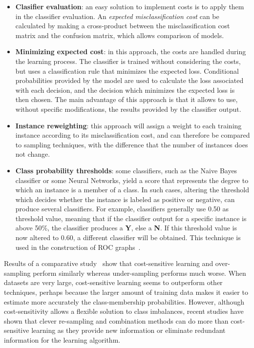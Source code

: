 \begin{itemize}
\item \textbf{Clasifier evaluation}: an easy solution to implement costs is to apply them in the classifier evaluation. An \textit{expected misclassification cost} can be calculated by making a cross-product between the misclassification cost matrix and the confusion matrix, which allows comparison of models.
\item \textbf{Minimizing expected cost}: in this approach, the costs are handled during the learning process. The classifier is trained without considering the costs, but uses a classification rule that minimizes the expected loss. Conditional probabilities provided by the model are used to calculate the loss associated with each decision, and the decision which minimizes the expected loss is then chosen. The main advantage of this approach is that it allows to use, without specific modifications, the results provided by the classifier output.
\item \textbf{Instance reweighting}: this approach will assign a weight to each training instance according to its misclassification cost, and can therefore be compared to sampling techniques, with the difference that the number of instances does not change.
\item \textbf{Class probability thresholds}: some classifiers, such as the Naive Bayes classifier or some Neural Networks, yield a score that represents the degree to which an instance is a member of a class.  In such cases, altering the threshold which decides whether the instance is labeled as positive or negative, can produce several classifiers. For example, classifiers generally use 0.50 as threshold value, meaning that if the classifier output for a specific instance is above 50\%, the classifier produces a \textbf{Y}, else a \textbf{N}.  If this threshold value is now altered to 0.60, a different classifier will be obtained.  This technique is used in the construction of ROC graphs~\cite{roc}.
\end{itemize}
Results of a comparative study~\cite{mccarthy} show that cost-sensitive learning and over-sampling perform similarly whereas under-sampling performs much worse.  When datasets are very large, cost-sensitive learning seems to outperform other techniques, perhaps because the larger amount of training data makes it easier to estimate more accurately the class-membership probabilities.  However, although cost-sensitivity allows a flexible solution to class imbalances, recent studies have shown that clever re-sampling and combination methods can do more than cost-sensitive learning as they provide new information or eliminate redundant information for the learning algorithm.~\cite{Chawla04editorial:special}



